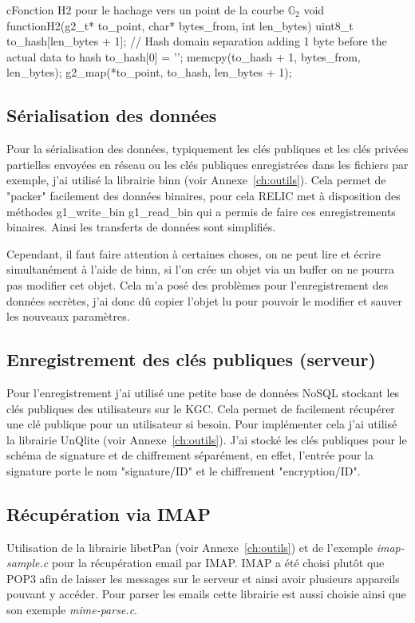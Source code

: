 \begin{sourcebox}{c}{Fonction H2 pour le hachage vers un point de la courbe $\mathbb{G}_2$}
	void functionH2(g2_t* to_point, char* bytes_from, int len_bytes){
		uint8_t to_hash[len_bytes + 1];
		// Hash domain separation adding 1 byte  before the actual data to hash
		to_hash[0] = '';
		memcpy(to_hash + 1, bytes_from, len_bytes);
		g2_map(*to_point, to_hash, len_bytes + 1);
	}
\end{sourcebox}

\subsection{Sérialisation des données}
Pour la sérialisation des données, typiquement les clés publiques et les clés privées partielles envoyées en réseau ou les clés publiques enregistrées dans les fichiers par exemple, j'ai utilisé la librairie binn (voir Annexe~\ref{ch:outils}). Cela permet de "packer" facilement des données binaires, pour cela RELIC met à disposition des méthodes g1\_write\_bin g1\_read\_bin qui a permis de faire ces enregistrements binaires. Ainsi les transferts de données sont simplifiés.

Cependant, il faut faire attention à certaines choses, on ne peut lire et écrire simultanément à l'aide de binn, si l'on crée un objet via un buffer on ne pourra pas modifier cet objet. Cela m'a posé des problèmes pour l'enregistrement des données secrètes, j'ai donc dû copier l'objet lu pour pouvoir le modifier et sauver les nouveaux paramètres.

\subsection{Enregistrement des clés publiques (serveur)}
Pour l'enregistrement j'ai utilisé une petite base de données NoSQL stockant les clés publiques des utilisateurs sur le KGC. Cela permet de facilement récupérer une clé publique pour un utilisateur si besoin. Pour implémenter cela j'ai utilisé la librairie UnQlite (voir Annexe~\ref{ch:outils}). J'ai stocké les clés publiques pour le schéma de signature et de chiffrement séparément, en effet, l'entrée pour la signature porte le nom "signature/ID" et le chiffrement "encryption/ID".

\subsection{Récupération via IMAP}
Utilisation de la librairie libetPan (voir Annexe~\ref{ch:outils}) et de l'exemple \textit{imap-sample.c} pour la récupération email par IMAP. IMAP a été choisi plutôt que POP3 afin de laisser les messages sur le serveur et ainsi avoir plusieurs appareils pouvant y accéder. Pour parser les emails cette librairie est aussi choisie ainsi que son exemple \textit{mime-parse.c}.

